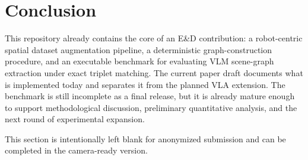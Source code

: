 \documentclass{article}
\begin{document}
\section{Conclusion}
This repository already contains the core of an E\&D contribution: a robot-centric spatial dataset augmentation pipeline, a deterministic graph-construction procedure, and an executable benchmark for evaluating VLM scene-graph extraction under exact triplet matching. The current paper draft documents what is implemented today and separates it from the planned VLA extension. The benchmark is still incomplete as a final release, but it is already mature enough to support methodological discussion, preliminary quantitative analysis, and the next round of experimental expansion.

\begin{ack}
This section is intentionally left blank for anonymized submission and can be completed in the camera-ready version.
\end{ack}
\end{document}
